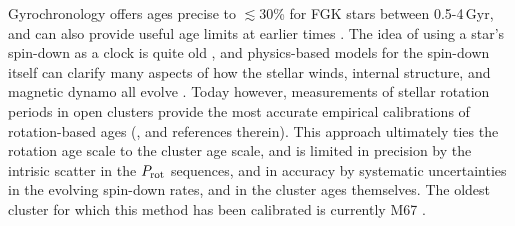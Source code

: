 \documentclass[11pt,twocolumn,tighten]{aastex63}
\begin{document}

Gyrochronology offers ages precise to $\lesssim$30\% for FGK stars
between 0.5-4\,Gyr, and can also provide useful age limits at
earlier times \citep{Bouma_2023}.  The idea of using a star's
spin-down as a clock is quite old
\citep{Skumanich_1972,Noyes_1984,Kawaler_1989,Barnes03,Mamajek_2008,Angus_2015},
and physics-based models for the spin-down itself can clarify many
aspects of how the stellar winds, internal structure, and magnetic
dynamo all evolve
\citep[e.g.][]{Matt_2015,Gallet_Bouvier_2015,Spada_2020}.  
Today however, measurements of stellar rotation periods in open
clusters provide the most accurate empirical calibrations of
rotation-based ages (\citealt{Bouma_2023}, and references therein).
This approach ultimately ties the rotation age scale to the cluster
age scale, and is limited in precision by the intrisic scatter in the
$P_{\rm rot}$ sequences, and in accuracy by systematic uncertainties
in the evolving spin-down rates, and in the cluster ages themselves.
The oldest cluster for which this method has been calibrated is
currently M67 \citep[$\approx$4\,Gyr][]{2022ApJ...938..118D}.
\end{document}
